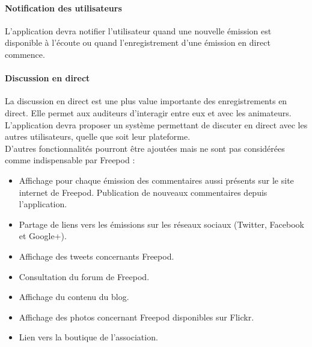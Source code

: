 \documentclass[11pt, french]{report}
\begin{document}
\paragraph{Notification des utilisateurs}
L’application devra notifier l’utilisateur quand une nouvelle émission est disponible à l’écoute ou quand l’enregistrement d’une émission en direct commence.

\paragraph{Discussion en direct}
La discussion en direct est une plus value importante des enregistrements en direct. Elle permet aux auditeurs d'interagir entre eux et avec les animateurs. L’application devra proposer un système permettant de discuter en direct avec les autres utilisateurs, quelle que soit leur plateforme.\\

D’autres fonctionnalités pourront être ajoutées mais ne sont pas considérées comme indispensable par Freepod :
\begin{itemize}
\item Affichage pour chaque émission des commentaires aussi présents sur le site internet de Freepod. Publication de nouveaux commentaires depuis l’application.
\item Partage de liens vers les émissions sur les réseaux sociaux (Twitter, Facebook et Google+).
\item Affichage des tweets concernants Freepod.
\item Consultation du forum de Freepod.
\item Affichage du contenu du blog.
\item Affichage des photos concernant Freepod disponibles sur Flickr.
\item Lien vers la boutique de l’association.
\end{itemize}





\nocite{*}

\end{document}
